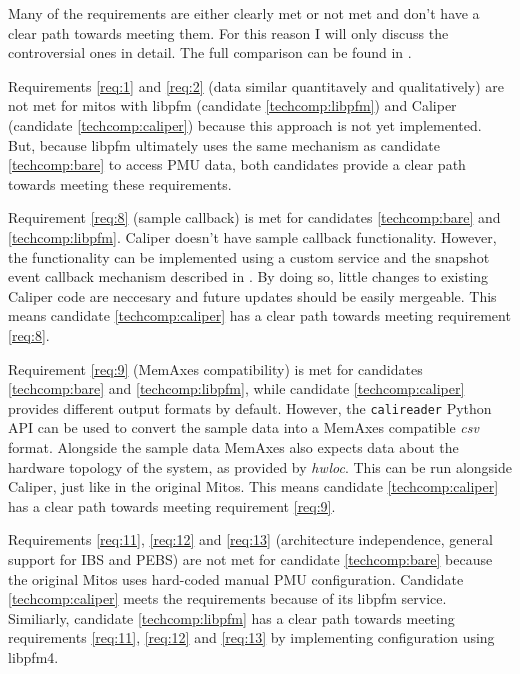Many of the requirements are either clearly met or not met and don't have a clear path towards meeting them. For this reason I will only discuss the controversial ones in detail. The full comparison can be found in .

Requirements \ref{req:1} and \ref{req:2} (data similar quantitavely and qualitatively) are not met for mitos with libpfm (candidate \ref{techcomp:libpfm}) and Caliper (candidate \ref{techcomp:caliper}) because this approach is not yet implemented. But, because libpfm ultimately uses the same mechanism as candidate \ref{techcomp:bare} to access PMU data, both candidates provide a clear path towards meeting these requirements.

Requirement \ref{req:8} (sample callback) is met for candidates \ref{techcomp:bare} and \ref{techcomp:libpfm}. Caliper doesn't have sample callback functionality. However, the functionality can be implemented using a custom service and the snapshot event callback mechanism described in . By doing so, little changes to existing Caliper code are neccesary and future updates should be easily mergeable. This means candidate \ref{techcomp:caliper} has a clear path towards meeting requirement \ref{req:8}.

Requirement \ref{req:9} (MemAxes compatibility) is met for candidates \ref{techcomp:bare} and \ref{techcomp:libpfm}, while candidate \ref{techcomp:caliper} provides different output formats by default. However, the \texttt{calireader} Python API can be used to convert the sample data into a MemAxes compatible \textit{csv} format. Alongside the sample data MemAxes also expects data about the hardware topology of the system, as provided by \textit{hwloc}. This can be run alongside Caliper, just like in the original Mitos. This means candidate \ref{techcomp:caliper} has a clear path towards meeting requirement \ref{req:9}.

Requirements \ref{req:11}, \ref{req:12} and \ref{req:13} (architecture independence, general support for IBS and PEBS) are not met for candidate \ref{techcomp:bare} because the original Mitos uses hard-coded manual PMU configuration.  Candidate \ref{techcomp:caliper} meets the requirements because of its libpfm service. Similiarly, candidate \ref{techcomp:libpfm} has a clear path towards meeting requirements \ref{req:11}, \ref{req:12} and \ref{req:13} by implementing configuration using libpfm4.

